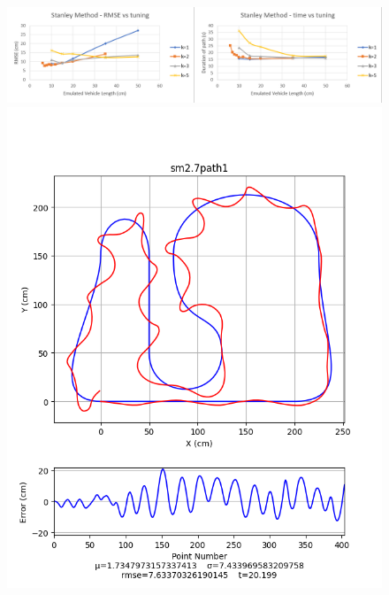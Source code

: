 \documentclass[mla8alt]{mla}
\begin{document}
\begin{paper}
\begin{figure}[H]
\includegraphics[width=\linewidth]{tuningGraphs/sm}
\includegraphics[width=\linewidth]{pathData/smpath1}
\endminipage\hfill
{}

\end{figure}
\end{paper}
\end{document}
